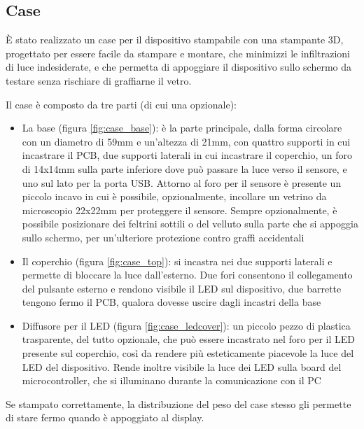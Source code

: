 \subsection{Case}
È stato realizzato un case per il dispositivo stampabile con una stampante 3D, progettato per essere facile da stampare e montare, che minimizzi le infiltrazioni di luce indesiderate, e che permetta di appoggiare il dispositivo sullo schermo da testare senza rischiare di graffiarne il vetro.

Il case è composto da tre parti (di cui una opzionale):
\begin{itemize}
	\item La base (figura \ref{fig:case_base}): è la parte principale, dalla forma circolare con un diametro di 59mm e un'altezza di 21mm, con quattro supporti in cui incastrare il PCB, due supporti laterali in cui incastrare il coperchio, un foro di 14x14mm sulla parte inferiore dove può passare la luce verso il sensore, e uno sul lato per la porta USB. Attorno al foro per il sensore è presente un piccolo incavo in cui è possibile, opzionalmente, incollare un vetrino da microscopio 22x22mm per proteggere il sensore. Sempre opzionalmente, è possibile posizionare dei feltrini sottili o del velluto sulla parte che si appoggia sullo schermo, per un'ulteriore protezione contro graffi accidentali
	\item Il coperchio (figura \ref{fig:case_top}): si incastra nei due supporti laterali e permette di bloccare la luce dall'esterno. Due fori consentono il collegamento del pulsante esterno e rendono visibile il LED sul dispositivo, due barrette tengono fermo il PCB, qualora dovesse uscire dagli incastri della base
	\item Diffusore per il LED (figura \ref{fig:case_ledcover}): un piccolo pezzo di plastica trasparente, del tutto opzionale, che può essere incastrato nel foro per il LED presente sul coperchio, così da rendere più esteticamente piacevole la luce del LED del dispositivo. Rende inoltre visibile la luce dei LED sulla board del microcontroller, che si illuminano durante la comunicazione con il PC
\end{itemize}

Se stampato correttamente, la distribuzione del peso del case stesso gli permette di stare fermo quando è appoggiato al display.

